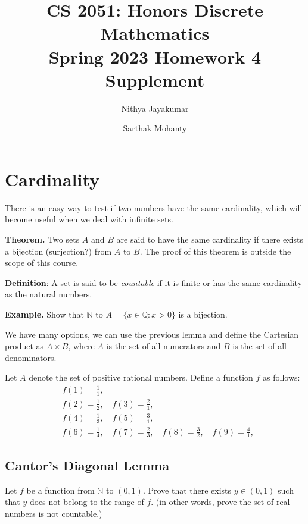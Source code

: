 \documentclass{article}
\title{\vspace{-1cm}CS 2051: Honors Discrete Mathematics \\Spring 2023 Homework 4 Supplement}
\author{Nithya Jayakumar 
\and Sarthak Mohanty }
\date{}
\begin{document}
\maketitle

\section*{Cardinality}
    
    There is an easy way to test if two numbers have the same cardinality, which will become useful when we deal with infinite sets.
    
    \vspace{1.5mm}
    \textbf{Theorem.} Two sets $A$ and $B$ are said to have the same cardinality if there exists a bijection (surjection?) from $A$ to $B$. The proof of this theorem is outside the scope of this course.
    
    \vspace{1.5mm}
    \textbf{Definition}: A set is said to be \textit{countable} if it is finite or has the same cardinality as the natural numbers.

    
    \textbf{Example.} 
    Show that $\mathbb{N}$ to $A = \{x \in \mathbb{Q}: x > 0\}$ is a bijection.
    
    We have many options, we can use the previous lemma and define the Cartesian product as $A \times B$, where $A$ is the set of all numerators and $B$ is the set of all denominators.
    
    
    Let $A$ denote the set of positive rational numbers. Define a function $f$ as follows:
    \begin{align*}
        & f(1) = \frac{1}{1}, \\
        & f(2) = \frac{1}{2}, \quad f(3) = \frac{2}{1}, \\
        & f(4) = \frac{1}{3}, \quad f(5) = \frac{3}{1}, \\
        & f(6) = \frac{1}{4}, \quad f(7) = \frac{2}{3}, \quad f(8) = \frac{3}{2}, \quad f(9) = \frac{4}{1},
    \end{align*}

\subsection*{Cantor's Diagonal Lemma}
    Let $f$ be a function from $\mathbb{N}$ to $(0, 1)$. Prove that there exists $y \in (0, 1)$ such that $y$ does not belong to the range of $f$. (in other words, prove the set of real numbers is not countable.)
\end{document}

